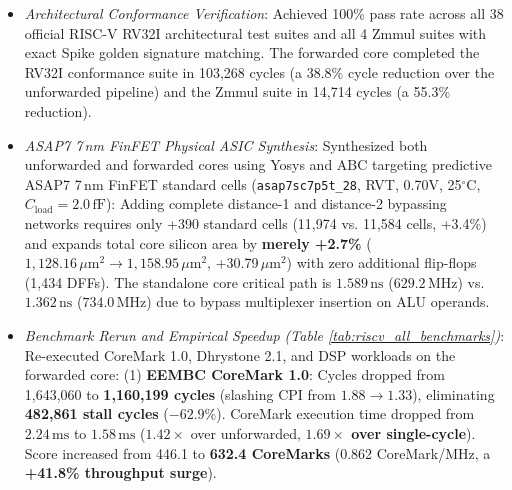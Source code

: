 \begin{itemize}
\begin{itemize}
        (1) \textbf{Distance-1 Forwarding (MEM/WB $\to$ EX)}: Forwarding from \texttt{ex\_mem} to ALU operands (\texttt{opA}, \texttt{opB}), branch condition comparator, \texttt{jalr} target computation, and store data (\texttt{rs2Data}) whenever \texttt{ex\_mem.regWrite} matches \texttt{id\_ex.rs1/rs2}, supporting all arithmetic results, \texttt{JAL/JALR} return addresses (\texttt{pc + 4}), \texttt{LUI} immediates, and \texttt{AUIPC} addresses.
        (2) \textbf{Distance-2 Write-Through Bypass (WB $\to$ ID)}: Internal register file bypass forwarding committing writeback data (\texttt{wbData}) directly to ID stage operands (\texttt{rs1Val}, \texttt{rs2Val}) when \texttt{wbWen} matches \texttt{d.rs1/rs2}.
        (3) \textbf{Revised Hazard Detection Unit}: Eliminated all RAW hazard stalls for ALU-to-ALU dependencies (0 stall cycles). Retained only the single irreducible \textbf{Load-Use Hazard} (where an instruction in ID reads the destination of a memory load currently in EX), inserting exactly 1 stall cycle before forwarding the loaded data from MEM/WB into EX.
        \item \textit{Architectural Conformance Verification}: Achieved 100\% pass rate across all 38 official RISC-V RV32I architectural test suites and all 4 Zmmul suites with exact Spike golden signature matching. The forwarded core completed the RV32I conformance suite in 103,268 cycles (a 38.8\% cycle reduction over the unforwarded pipeline) and the Zmmul suite in 14,714 cycles (a 55.3\% reduction).
        \item \textit{ASAP7 7\,nm FinFET Physical ASIC Synthesis}: Synthesized both unforwarded and forwarded cores using Yosys and ABC targeting predictive ASAP7 7\,nm FinFET standard cells (\texttt{asap7sc7p5t\_28}, RVT, 0.70V, 25$^\circ$C, $C_{\text{load}} = 2.0\,\text{fF}$):
        Adding complete distance-1 and distance-2 bypassing networks requires only +390 standard cells (11,974 vs. 11,584 cells, +3.4\%) and expands total core silicon area by \textbf{merely +2.7\%} ($1,128.16\,\mu\text{m}^2 \to 1,158.95\,\mu\text{m}^2$, +30.79\,$\mu\text{m}^2$) with zero additional flip-flops (1,434 DFFs).
        The standalone core critical path is $1.589\,\text{ns}$ ($629.2\,\text{MHz}$) vs. $1.362\,\text{ns}$ ($734.0\,\text{MHz}$) due to bypass multiplexer insertion on ALU operands.
        \item \textit{Benchmark Rerun and Empirical Speedup (Table \ref{tab:riscv_all_benchmarks})}: Re-executed CoreMark 1.0, Dhrystone 2.1, and DSP workloads on the forwarded core:
        (1) \textbf{EEMBC CoreMark 1.0}: Cycles dropped from 1,643,060 to \textbf{1,160,199 cycles} (slashing CPI from $1.88 \to 1.33$), eliminating \textbf{482,861 stall cycles} ($-62.9\%$). CoreMark execution time dropped from $2.24\,\text{ms}$ to \textbf{$1.58\,\text{ms}$} ($1.42\times$ over unforwarded, \textbf{$1.69\times$ over single-cycle}). Score increased from 446.1 to \textbf{632.4 CoreMarks} (0.862 CoreMark/MHz, a \textbf{+41.8\% throughput surge}).

\end{itemize}
\end{itemize}
